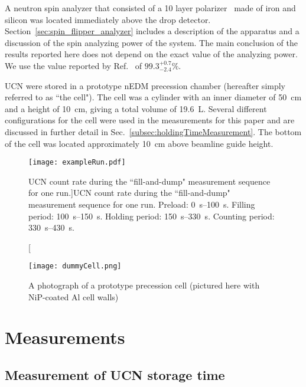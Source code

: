 A neutron spin analyzer that consisted of a 10 layer polarizer~\cite{ThorstenThesis} made of iron and silicon was located immediately above the drop detector. Section~\ref{sec:spin_flipper_analyzer} includes a description of the apparatus and a discussion of the spin analyzing power of the system. The main conclusion of the results reported here does not depend on the exact value of the analyzing power. We use the value reported by Ref.~\cite{ThorstenThesis} of $99.3^{+0.7}_{-2.4}\%$.

UCN were stored in a prototype nEDM precession chamber (hereafter simply referred to as ``the cell"). The cell was a cylinder with an inner diameter of \qty{50}{\cm} and a height of \qty{10}{\cm}, giving a total volume of \qty{19.6}{\liter}. Several different configurations for the cell were used in the measurements for this paper and are discussed in further detail in Sec.~\ref{subsec:holdingTimeMeasurement}. The bottom of the cell was located approximately \qty{10}{\cm} above beamline guide height.

\begin{figure}
    \centering
    \texttt{[image: exampleRun.pdf]}
    \caption[UCN count rate during the ``fill-and-dump" measurement sequence for one run.]{UCN count rate during the ``fill-and-dump" measurement sequence for one run. Preload: \qtyrange{0}{100}{\s}. Filling period: \qtyrange{100}{150}{\s}. Holding period: \qtyrange{150}{330}{\s}. Counting period: \qtyrange{330}{430}{\s}.}
    \label{fig:timeSpectrum}
\end{figure}

\begin{figure}
    \centering
    \texttt{[image: dummyCell.png]}
    \caption[A photograph of a prototype precession cell]{A photograph of a prototype precession cell (pictured here with NiP-coated Al cell walls)}
    \label{fig:dummyCell}
\end{figure}


\section{\label{sec:measurement}Measurements}

\subsection{\label{subsec:holdingTimeMeasurement}Measurement of UCN storage time}

